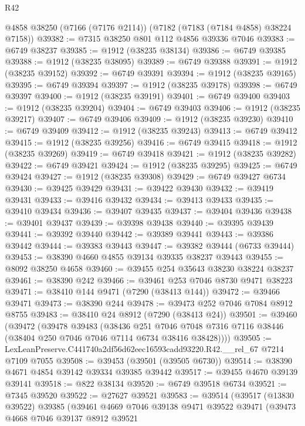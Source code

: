 \begin{lexlean}{R42}
\begin{coremodule}
{    @4858
    @38250
    (@7166 (@7176 @2114))
    (@7182 (@7183 (@7184 @4858) @38224 @7158))
@39382 := @7315 @38250 @801 @112 @4856 @39336 @7046
@39383 := @6749 @38237
@39385 := @1912 (@38235 @38134)
@39386 := @6749 @39385
@39388 := @1912 (@38235 @38095)
@39389 := @6749 @39388
@39391 := @1912 (@38235 @39152)
@39392 := @6749 @39391
@39394 := @1912 (@38235 @39165)
@39395 := @6749 @39394
@39397 := @1912 (@38235 @39178)
@39398 := @6749 @39397
@39400 := @1912 (@38235 @39191)
@39401 := @6749 @39400
@39403 := @1912 (@38235 @39204)
@39404 := @6749 @39403
@39406 := @1912 (@38235 @39217)
@39407 := @6749 @39406
@39409 := @1912 (@38235 @39230)
@39410 := @6749 @39409
@39412 := @1912 (@38235 @39243)
@39413 := @6749 @39412
@39415 := @1912 (@38235 @39256)
@39416 := @6749 @39415
@39418 := @1912 (@38235 @39269)
@39419 := @6749 @39418
@39421 := @1912 (@38235 @39282)
@39422 := @6749 @39421
@39424 := @1912 (@38235 @39295)
@39425 := @6749 @39424
@39427 := @1912 (@38235 @39308)
@39429 := @6749 @39427 @6734
@39430 := @39425 @39429
@39431 := @39422 @39430
@39432 := @39419 @39431
@39433 := @39416 @39432
@39434 := @39413 @39433
@39435 := @39410 @39434
@39436 := @39407 @39435
@39437 := @39404 @39436
@39438 := @39401 @39437
@39439 := @39398 @39438
@39440 := @39395 @39439
@39441 := @39392 @39440
@39442 := @39389 @39441
@39443 := @39386 @39442
@39444 := @39383 @39443
@39447 := @39382 @39444 (@6733 @39444)
@39453 := @38390 @4660 @4855 @39134 @39335 @38237 @39443
@39455 := @8092 @38250 @4658
@39460 := @39455 @254 @35643 @38230 @38224 @38237
@39461 := @38390 @242
@39466 := @39461 @253 @7046 @8730 @9471 @38223
@39471 := @38410 @144 @9471 (@7290 (@38413 @144))
@39472 := @39466 @39471
@39473 := @38390 @244
@39478 := @39473 @252 @7046 @7084 @8912 @8755
@39483 := @38410 @24 @8912 (@7290 (@38413 @24))
@39501 := @39460
    (@39472
      (@39478
        @39483
        (@38436
          @251
          @7046
          @7048
          @7316
          @7116
          @38446
          (@38404 @250 @7046 @7046 @7114 @6734 @38416 @38428))))
@39505 := LexLeanPreserve.C441740a2df56d62eec16593cadd93220.R42.__rel_67 @7214 @7109 @7055
@39508 := @39453 (@39501 (@39505 @6730))
@39514 := @38390 @4671 @4854 @39142 @39334 @39385 @39442
@39517 := @39455 @4670 @39139 @39141
@39518 := @822 @38134
@39520 := @6749 @39518 @6734
@39521 := @7345 @39520
@39522 := @27627 @39521
@39583 := @39514
    (@39517
      (@13830 @39522)
      @39385
      (@39461
        @4669
        @7046
        @39138
        @9471
        @39522
        @39471
        (@39473
          @4668
          @7046
          @39137
          @8912
          @39521
}
\end{coremodule}
\end{lexlean}
